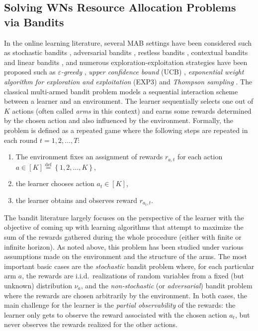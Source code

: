 \documentclass[10pt,journal,compsoc]{IEEEtran}
\begin{document}
	\subsection{Solving WNs Resource Allocation Problems via Bandits}
	\label{section:previous_work}
	In the online learning literature, several MAB settings have been considered such as stochastic bandits \cite{thompson1933likelihood,lai1985asymptotically,auer2002finite}, adversarial bandits \cite{auer1995gambling,auer2002nonstochastic}, restless bandits \cite{whittle1988restless}, contextual bandits \cite{LCLS10} and linear bandits \cite{abe2003reinforcement,APS11}, and numerous exploration-exploitation strategies have been proposed such as \textit{$\varepsilon$-greedy} \cite{sutton1998reinforcement,auer2002finite}, \textit{upper confidence bound} (UCB) \cite{lai1985asymptotically,Agr95,BuKa96,auer2002finite}, \textit{exponential weight algorithm for exploration and exploitation} (EXP3) \cite{auer1995gambling,auer2002finite} and \textit{Thompson sampling} \cite{thompson1933likelihood}. The classical multi-armed bandit problem models a sequential interaction scheme between a learner and an environment. The learner sequentially selects one out of $K$ actions (often called \emph{arms} in this context) and earns some rewards determined by the chosen action and also influenced by the environment. Formally, the problem 
	is defined as a repeated game where the following steps are repeated in each round $t=1,2,\dots,T$:
	\begin{enumerate}
		\item The environment fixes an assignment of rewards $r_{a,t}$ for each action $a\in[K] \stackrel{\text{def}}{=} \left\{1,2,\dots,K\right\}$,
		\item the learner chooses action $a_t\in[K]$,
		\item the learner obtains and observes reward $r_{a_t,t}$.
	\end{enumerate}
	The bandit literature largely focuses on the perspective of the learner with the objective of coming up with learning algorithms that attempt to maximize the sum of the rewards gathered during the whole procedure (either with finite or infinite horizon). As noted above, this problem has been studied under various assumptions made on the environment and the structure of the arms. The most important basic cases are the \emph{stochastic} bandit problem where, for each particular arm $a$, the rewards are i.i.d.~realizations of random variables from a fixed (but unknown) distribution $\nu_a$, and the \emph{non-stochastic} (or \emph{adversarial}) bandit problem where the rewards are chosen arbitrarily by the environment. In both cases, the main challenge for the learner is the \emph{partial observability} of the rewards: the learner only gets to observe the reward associated with the chosen action $a_t$, but never observes the rewards realized for the other actions.
	
\end{document}
